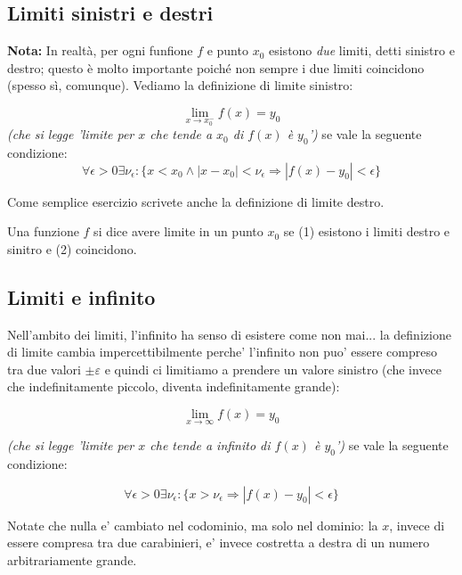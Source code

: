 \subsection{Limiti sinistri e destri}

{\bf Nota:} In realtà, per ogni funfione $f$ e punto $x_0$ esistono {\em due} limiti, detti sinistro e destro; questo è molto
importante poiché non sempre i due limiti coincidono (spesso sì, comunque). Vediamo la definizione di limite sinistro:

\begin{equation}
\lim_{x \to x_0^-} f(x) = y_0
\end{equation}
{\em (che si legge 'limite per $x$ che tende a $x_0$ di $f(x)$ è $y_0$')} se vale la seguente condizione:
\begin{equation}\label{definizionelimitebis}
\forall \epsilon >0 \exists \nu_\epsilon : \{ x<x_0 \wedge |x-x_0|<\nu_\epsilon \Longrightarrow  |f(x)-y_0|<\epsilon   \}
\end{equation}

Come semplice esercizio scrivete anche la definizione di limite destro.

Una funzione $f$ si dice avere limite in un punto $x_0$ se (1) esistono i limiti destro e sinitro e (2) coincidono.


\subsection{Limiti e infinito}

Nell'ambito dei limiti, l'infinito ha senso di esistere come non mai... la definizione di limite cambia impercettibilmente perche'
l'infinito non puo' essere compreso tra due valori $ \pm  \varepsilon $ e quindi ci limitiamo a prendere un valore sinistro (che invece
che indefinitamente piccolo, diventa indefinitamente grande):


\begin{equation}
    \lim_{x \to \infty} f(x) = y_0
\end{equation}

{\em (che si legge 'limite per $x$ che tende a infinito di $f(x)$ è $y_0$')} se vale la seguente condizione:

\begin{equation}\label{definizionelimitebis}
    \forall \epsilon >0 \exists \nu_\epsilon : \{  x > \nu_\epsilon \Longrightarrow  |f(x)-y_0|<\epsilon \}
\end{equation}

Notate che nulla e' cambiato nel codominio, ma solo nel dominio: la $x$, invece di essere compresa tra due carabinieri,
e' invece costretta a destra di un numero arbitrariamente grande.

